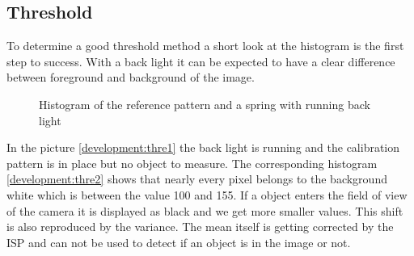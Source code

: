 \subsection{Threshold}
To determine a good threshold method a short look at the histogram is the first step to success. With a back light it can be expected to have a clear difference between foreground and background of the image. 
\begin{figure}[ht]
	\caption{Histogram of the reference pattern and a spring with running back light\label{development:thre}}	
\end{figure}
In the picture \ref{development:thre1} the back light is running and the calibration pattern is in place but no object to measure. The corresponding histogram \ref{development:thre2} shows that nearly every pixel belongs to the background white which is between the value 100 and 155. If a object enters the field of view of the camera it is displayed as black and we get more smaller values. This shift is also reproduced by the variance. The mean itself is getting corrected by the ISP and can not be used to detect if an object is in the image or not.\\



